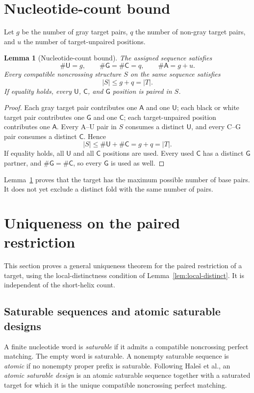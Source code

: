 \documentclass[11pt]{article}
\newtheorem{lemma}[theorem]{Lemma}
\newcommand{\A}{\textsf{A}}
\newcommand{\C}{\textsf{C}}
\newcommand{\G}{\textsf{G}}
\newcommand{\U}{\textsf{U}}
\begin{document}
\section{Nucleotide-count bound}
\label{sec:inventory}

Let $g$ be the number of gray target pairs, $q$ the number of non-gray target pairs, and $u$ the number of target-unpaired positions.

\begin{lemma}[Nucleotide-count bound]
\label{lem:inventory}
The assigned sequence satisfies
\[
\#\U=g,
\qquad
\#\G=\#\C=q,
\qquad
\#\A=g+u.
\]
Every compatible noncrossing structure $S$ on the same sequence satisfies
\[
|S|\le g+q=|T|.
\]
If equality holds, every $\U$, $\C$, and $\G$ position is paired in $S$.
\end{lemma}

\begin{proof}
Each gray target pair contributes one $\A$ and one $\U$; each black or white target pair contributes one $\G$ and one $\C$; each target-unpaired position contributes one $\A$.  Every A--U pair in $S$ consumes a distinct $\U$, and every C--G pair consumes a distinct $\C$.  Hence
\[
|S|\le \#\U+\#\C=g+q=|T|.
\]
If equality holds, all $\U$ and all $\C$ positions are used.  Every used $\C$ has a distinct $\G$ partner, and $\#\G=\#\C$, so every $\G$ is used as well.
\end{proof}

Lemma~\ref{lem:inventory} proves that the target has the maximum possible number of base pairs.  It does not yet exclude a distinct fold with the same number of pairs.

\section{Uniqueness on the paired restriction}
\label{sec:saturated}

This section proves a general uniqueness theorem for the paired restriction of a target, using the local-distinctness condition of Lemma~\ref{lem:local-distinct}.  It is independent of the short-helix count.

\subsection{Saturable sequences and atomic saturable designs}

A finite nucleotide word is \emph{saturable} if it admits a compatible noncrossing perfect matching.  The empty word is saturable.  A nonempty saturable sequence is \emph{atomic} if no nonempty proper prefix is saturable.  Following Hale\v{s} et al., an \emph{atomic saturable design} is an atomic saturable sequence together with a saturated target for which it is the unique compatible noncrossing perfect matching.
\end{document}
